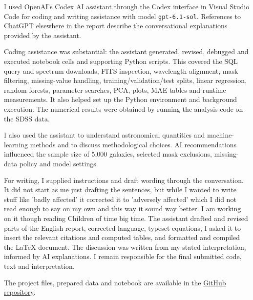 \documentclass[12pt,a4paper]{article}
\begin{document}
I used OpenAI's Codex AI assistant through the Codex interface in Visual Studio Code for coding and writing assistance with model \texttt{gpt-6.1-sol}. References to ChatGPT elsewhere in the report describe the conversational explanations provided by the assistant.

Coding assistance was substantial: the assistant generated, revised, debugged and executed notebook cells and supporting Python scripts. This covered the SQL query and spectrum downloads, FITS inspection, wavelength alignment, mask filtering, missing-value handling, training/validation/test splits, linear regression, random forests, parameter searches, PCA, plots, MAE tables and runtime measurements. It also helped set up the Python environment and background execution. The numerical results were obtained by running the analysis code on the SDSS data.

I also used the assistant to understand astronomical quantities and machine-learning methods and to discuss methodological choices. AI recommendations influenced the sample size of 5,000 galaxies, selected mask exclusions, missing-data policy and model settings. 

For writing, I supplied instructions and draft wording through the conversation. It did not start as me just drafting the sentences, but while I wanted to write stuff like 'badly affected' it corrected it to 'adversely affected' which I did not read enough to say on my own and this way it sound way better. I am working on it though reading Children of time big time. The assistant drafted and revised parts of the English report, corrected language, typeset equations, I asked it to insert the relevant citations and computed tables, and formatted and compiled the LaTeX document. The discussion was written from my stated interpretation, informed by AI explanations. I remain responsible for the final submitted code, text and interpretation.

The project files, prepared data and notebook are available in the \href{https://github.com/malkouka07/Data_mining_machine_learning_course/tree/main/SDSS-spectral-analysis}{GitHub repository}.
\end{document}
